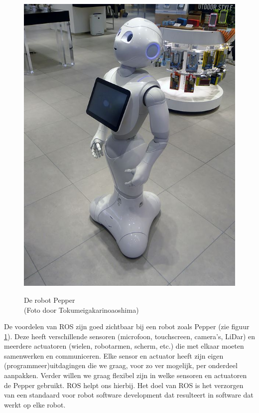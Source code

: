 \begin{figure}[ht]
\begin{center}
\includegraphics[scale=0.5]{Pictures/robot_pepper.JPG}\\
\end{center}
\caption{De robot Pepper\\{\tiny(Foto door Tokumeigakarinoaoshima\cite{Tokumeigakarinoaoshima})}}\label{fig:pepper}
\end{figure}

De voordelen van ROS zijn goed zichtbaar bij een robot zoals Pepper (zie figuur \ref{fig:pepper}). Deze heeft verschillende sensoren (microfoon, touchscreen, camera's, LiDar) en meerdere actuatoren (wielen, robotarmen, scherm, etc.) die met elkaar moeten samenwerken en communiceren. Elke sensor en actuator heeft zijn eigen (programmeer)uitdagingen die we graag, voor zo ver mogelijk, per onderdeel aanpakken. Verder willen we graag flexibel zijn in welke sensoren en actuatoren de Pepper gebruikt. ROS helpt ons hierbij. Het doel van ROS is het verzorgen van een standaard voor robot software development dat resulteert in software dat werkt op elke robot. 

